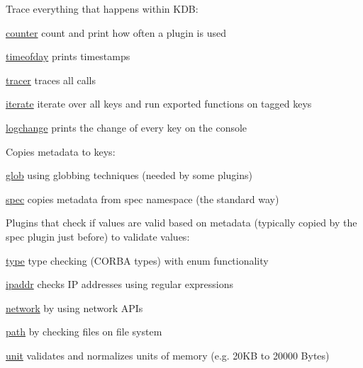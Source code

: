 Trace everything that happens within K\+DB\+:


\begin{DoxyItemize}
\item \hyperlink{autotoc_md104_src_plugins_counter_README_md}{counter} count and print how often a plugin is used
\item \hyperlink{autotoc_md632_src_plugins_timeofday_README_md}{timeofday} prints timestamps
\item \hyperlink{autotoc_md742_src_plugins_tracer_README_md}{tracer} traces all calls
\item \hyperlink{autotoc_md304_src_plugins_iterate_README_md}{iterate} iterate over all keys and run exported functions on tagged keys
\item \hyperlink{autotoc_md357_src_plugins_logchange_README_md}{logchange} prints the change of every key on the console
\end{DoxyItemize}

Copies metadata to keys\+:


\begin{DoxyItemize}
\item \hyperlink{autotoc_md236_src_plugins_glob_README_md}{glob} using globbing techniques (needed by some plugins)
\item \hyperlink{autotoc_md605_src_plugins_spec_README_md}{spec} copies metadata from spec namespace (the standard way)
\end{DoxyItemize}

Plugins that check if values are valid based on metadata (typically copied by the {\ttfamily spec} plugin just before) to validate values\+:


\begin{DoxyItemize}
\item \hyperlink{autotoc_md745_src_plugins_type_README_md}{type} type checking (C\+O\+R\+BA types) with enum functionality
\item \hyperlink{autotoc_md287_src_plugins_ipaddr_README_md}{ipaddr} checks IP addresses using regular expressions
\item \hyperlink{autotoc_md453_src_plugins_network_README_md}{network} by using network A\+P\+Is
\item \hyperlink{autotoc_md486_src_plugins_path_README_md}{path} by checking files on file system
\item \hyperlink{autotoc_md756_src_plugins_unit_README_md}{unit} validates and normalizes units of memory (e.\+g. 20\+KB to 20000 Bytes)
\end{DoxyItemize}

